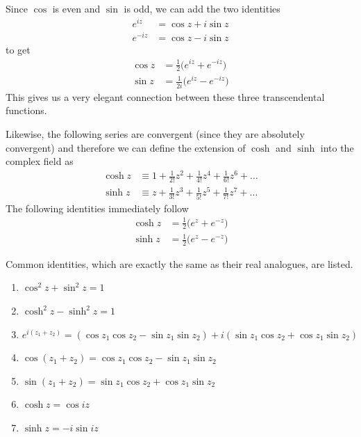       Since $\cos$ is even and $\sin$ is odd, we can add the two identities
      \begin{align*}
          e^{iz} & = \cos{z} + i \sin{z} \\
          e^{-iz} & = \cos{z} - i \sin{z} 
      \end{align*}
      to get 
      \begin{align*}
          \cos{z} & = \frac{1}{2}\big( e^{iz} + e^{-iz} \big) \\
          \sin{z} & = \frac{1}{2i} \big( e^{iz} - e^{-iz} \big)
      \end{align*}
      This gives us a very elegant connection between these three transcendental functions. 

      \begin{definition}
        Likewise, the following series are convergent (since they are absolutely convergent) and therefore we can define the extension of $\cosh$ and $\sinh$ into the complex field as 
        \begin{align*}
            \cosh{z} & \equiv 1 + \frac{1}{2!} z^2 + \frac{1}{4!} z^4 + \frac{1}{6!} z^6 + \ldots \\
            \sinh{z} & \equiv z + \frac{1}{3!} z^3 + \frac{1}{5!} z^5 + \frac{1}{7!} z^7 + \ldots 
        \end{align*}
        The following identities immediately follow
        \begin{align*}
            \cosh{z} & = \frac{1}{2} \big( e^z + e^{-z} \big) \\
            \sinh{z} & = \frac{1}{2} \big( e^{z} - e^{-z}\big) 
        \end{align*}
      \end{definition}

      \begin{lemma}
        Common identities, which are exactly the same as their real analogues, are listed. 
        \begin{enumerate}
          \item $\cos^2{z} + \sin^2 {z} = 1$
          \item $\cosh^2{z} - \sinh^2{z} = 1$ 
          \item $e^{i(z_1 + z_2)} = (\cos{z_1} \cos{z_2} - \sin{z_1} \sin{z_2}) + i (\sin{z_1} \cos{z_2} + \cos{z_1} \sin{z_2})$
          \item $\cos{(z_1 + z_2)} = \cos{z_1} \cos{z_2} - \sin{z_1} \sin{z_2}$
          \item $\sin{(z_1 + z_2)} = \sin{z_1} \cos{z_2} + \cos{z_1} \sin{z_2}$
          \item $\cosh{z} = \cos{iz}$ 
          \item $\sinh{z} = -i \sin{iz}$
        \end{enumerate}
      \end{lemma}

